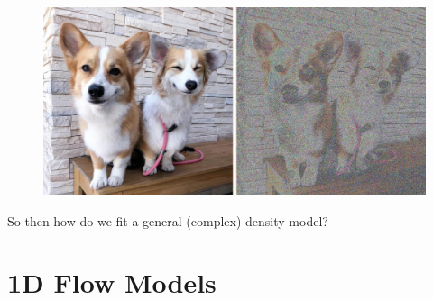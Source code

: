\begin{concept}
    \begin{figure}[H]
        \centering
        \includegraphics[width=1.0\textwidth]{.././assets/10.2.png}
    \end{figure}

    So then how do we fit a general (complex) density model?
\end{concept}

\section{1D Flow Models}

